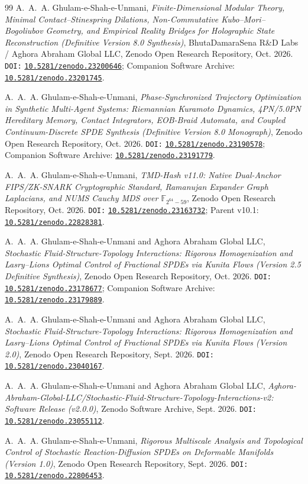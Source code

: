 \documentclass[11pt,a4paper,reqno]{article}
\newcommand{\zenodo}[1]{\href{https://doi.org/10.5281/zenodo.#1}{\nolinkurl{10.5281/zenodo.#1}}}
\theoremstyle{plain}
\theoremstyle{definition}
\theoremstyle{remark}
\numberwithin{equation}{section}
\begin{document}
\begin{thebibliography}{99}
A.~A.~A. Ghulam-e-Shah-e-Unmani,
\emph{Finite-Dimensional Modular Theory, Minimal Contact--Stinespring Dilations, Non-Commutative Kubo--Mori--Bogoliubov Geometry, and Empirical Reality Bridges for Holographic State Reconstruction (Definitive Version 8.0 Synthesis)},
BhutaDamaraSena R\&D Labs / Aghora Abraham Global LLC, Zenodo Open Research Repository, Oct. 2026.
\texttt{DOI:} \zenodo{23200646}; Companion Software Archive: \zenodo{23201745}.

A.~A.~A. Ghulam-e-Shah-e-Unmani,
\emph{Phase-Synchronized Trajectory Optimization in Synthetic Multi-Agent Systems: Riemannian Kuramoto Dynamics, 4PN/5.0PN Hereditary Memory, Contact Integrators, EOB-Braid Automata, and Coupled Continuum-Discrete SPDE Synthesis (Definitive Version 8.0 Monograph)},
Zenodo Open Research Repository, Oct. 2026.
\texttt{DOI:} \zenodo{23190578}; Companion Software Archive: \zenodo{23191779}.

A.~A.~A. Ghulam-e-Shah-e-Unmani,
\emph{TMD-Hash v11.0: Native Dual-Anchor FIPS/ZK-SNARK Cryptographic Standard, Ramanujan Expander Graph Laplacians, and NUMS Cauchy MDS over $\mathbb{F}_{2^{64}-59}$},
Zenodo Open Research Repository, Oct. 2026.
\texttt{DOI:} \zenodo{23163732}; Parent v10.1: \zenodo{22828381}.

A.~A.~A. Ghulam-e-Shah-e-Unmani and {Aghora Abraham Global LLC},
\emph{Stochastic Fluid-Structure-Topology Interactions: Rigorous Homogenization and Lasry--Lions Optimal Control of Fractional SPDEs via Kunita Flows (Version 2.5 Definitive Synthesis)},
Zenodo Open Research Repository, Oct. 2026.
\texttt{DOI:} \zenodo{23178677}; Companion Software Archive: \zenodo{23179889}.

A.~A.~A. Ghulam-e-Shah-e-Unmani and {Aghora Abraham Global LLC},
\emph{Stochastic Fluid-Structure-Topology Interactions: Rigorous Homogenization and Lasry--Lions Optimal Control of Fractional SPDEs via Kunita Flows (Version 2.0)},
Zenodo Open Research Repository, Sept. 2026.
\texttt{DOI:} \zenodo{23040167}.

A.~A.~A. Ghulam-e-Shah-e-Unmani and {Aghora Abraham Global LLC},
\emph{Aghora-Abraham-Global-LLC/Stochastic-Fluid-Structure-Topology-Interactions-v2: Software Release (v2.0.0)},
Zenodo Software Archive, Sept. 2026.
\texttt{DOI:} \zenodo{23055112}.

A.~A.~A. Ghulam-e-Shah-e-Unmani,
\emph{Rigorous Multiscale Analysis and Topological Control of Stochastic Reaction-Diffusion SPDEs on Deformable Manifolds (Version 1.0)},
Zenodo Open Research Repository, Sept. 2026.
\texttt{DOI:} \zenodo{22806453}.


\end{thebibliography}
\end{document}

